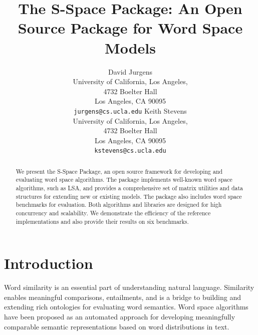 %
\usepackage{acl2010}
\usepackage{times}
\usepackage{url}
\usepackage{latexsym}
\usepackage{epsfig}
\usepackage{latexsym}
\usepackage[usenames]{color}
\usepackage{times} 
\usepackage{verbatim}
\usepackage{multirow}
\usepackage{threeparttable}
\usepackage{booktabs}

\title{The S-Space Package: An Open Source Package for Word Space Models}

\author{ David Jurgens\\
  University of California, Los Angeles, \\
  4732 Boelter Hall \\
  Los Angeles, CA 90095 \\
  {\tt jurgens@cs.ucla.edu} \And
  Keith Stevens\\
  University of California, Los Angeles, \\
  4732 Boelter Hall \\
  Los Angeles, CA 90095 \\
  {\tt kstevens@cs.ucla.edu}}


\date{}


\maketitle
\begin{abstract}

We present the S-Space Package, an open source framework for developing and
evaluating word space algorithms.  The package implements well-known word space
algorithms, such as LSA, and provides a comprehensive set of matrix utilities
and data structures for extending new or existing models.  The package also
includes word space benchmarks for evaluation.  Both algorithms and
libraries are designed for high concurrency and scalability.  We demonstrate the
efficiency of the reference implementations and also provide their results on
six benchmarks.

\end{abstract}

\section{Introduction}

Word similarity is an essential part of understanding natural language.
Similarity enables meaningful comparisons, entailments, and is a bridge to
building and extending rich ontologies for evaluating word semantics.  Word
space algorithms have been proposed as an automated approach for developing
meaningfully comparable semantic representations based on word distributions in
text.

